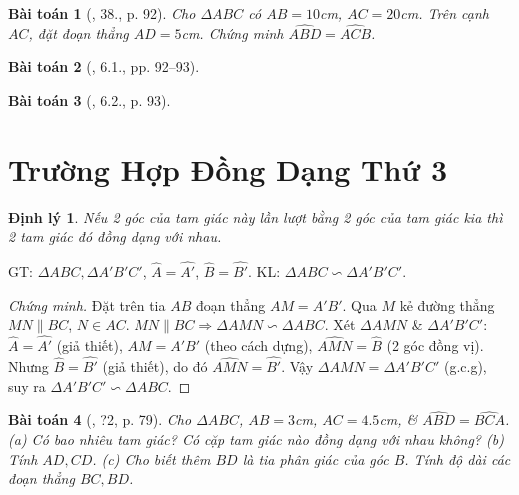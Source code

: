 \documentclass{article}
\newtheorem{baitoan}{Bài toán}
\newtheorem{dinhly}{Định lý}
\begin{document}
\begin{baitoan}[\cite{SBT_Toan_8_tap_2}, 38., p. 92]
	Cho $\Delta ABC$ có $AB = 10$\emph{cm}, $AC = 20$\emph{cm}. Trên cạnh $AC$, đặt đoạn thẳng $AD = 5$\emph{cm}. Chứng minh $\widehat{ABD} = \widehat{ACB}$.
\end{baitoan}

\begin{baitoan}[\cite{SBT_Toan_8_tap_2}, 6.1., pp. 92--93]
	
\end{baitoan}

\begin{baitoan}[\cite{SBT_Toan_8_tap_2}, 6.2., p. 93]
	
\end{baitoan}


\section{Trường Hợp Đồng Dạng Thứ 3}

\begin{dinhly}
	Nếu 2 góc của tam giác này lần lượt bằng 2 góc của tam giác kia thì 2 tam giác đó đồng dạng với nhau.
\end{dinhly}
GT: $\Delta ABC,\Delta A'B'C'$, $\widehat{A} = \widehat{A'}$, $\widehat{B} = \widehat{B'}$. KL: $\Delta ABC\backsim\Delta A'B'C'$.

\begin{proof}[Chứng minh]
	Đặt trên tia $AB$ đoạn thẳng $AM = A'B'$. Qua $M$ kẻ đường thẳng $MN\parallel BC$, $N\in AC$. $MN\parallel BC\Rightarrow\Delta AMN\backsim\Delta ABC$. Xét $\Delta AMN$ \& $\Delta A'B'C'$: $\widehat{A} = \widehat{A'}$ (giả thiết), $AM = A'B'$ (theo cách dựng), $\widehat{AMN} = \widehat{B}$ (2 góc đồng vị). Nhưng $\widehat{B} = \widehat{B'}$ (giả thiết), do đó $\widehat{AMN} = \widehat{B'}$. Vậy $\Delta AMN = \Delta A'B'C'$ (g.c.g), suy ra $\Delta A'B'C'\backsim\Delta ABC$.
\end{proof}

\begin{baitoan}[\cite{SGK_Toan_8_tap_2}, ?2, p. 79]
	Cho $\Delta ABC$, $AB = 3$\emph{cm}, $AC = 4.5$\emph{cm}, \& $\widehat{ABD} = \widehat{BCA}$. (a) Có bao nhiêu tam giác? Có cặp tam giác nào đồng dạng với nhau không? (b) Tính $AD,CD$. (c) Cho biết thêm $BD$ là tia phân giác của góc $B$. Tính độ dài các đoạn thẳng $BC,BD$.
\end{baitoan}
\end{document}
